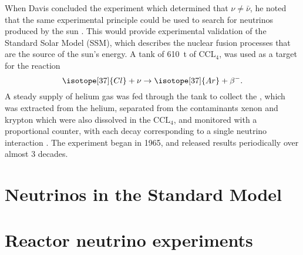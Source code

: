 When Davis concluded the experiment which determined that $\nu\neq\bar{\nu}$,
he noted that the same experimental principle could be used
to search for neutrinos produced by the sun \cite{davis_diff_nuebar}.
This would provide experimental validation of the Standard Solar Model (SSM),
which describes the nuclear fusion processes
that are the source of the sun's energy.
A tank of \SI{610}{\tonne} of $\text{CCL}_4$,
was used as a target for the reaction
\begin{equation}\label{eq:davis_nu}
    \isotope[37]{Cl} + \nu \to \isotope[37]{Ar} + \beta^-.
\end{equation}
A steady supply of helium gas was fed through the tank
to collect the ,
which was extracted from the helium,
separated from the contaminants xenon and krypton which were
also dissolved in the $\text{CCL}_4$,
and monitored with a proportional counter,
with each decay corresponding to a single neutrino interaction \cite{homestake1968}.
The experiment began in 1965, and released results periodically
over almost 3 decades.





\section{Neutrinos in the Standard Model}
\label{sec:theory}

\section{Reactor neutrino experiments}
\label{sec:experiment_intro}

